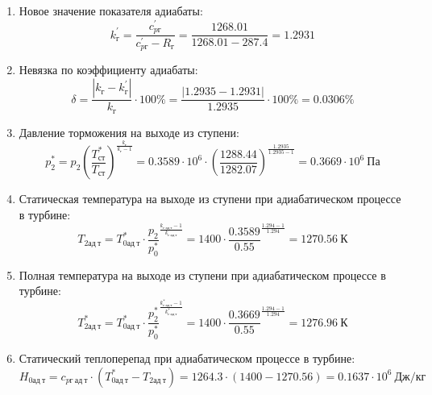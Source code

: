 \documentclass[a4paper,10pt]{article}
\begin{document}
\begin{enumerate}
        \item Новое значение показателя адиабаты:
        \[
            k_г^\prime = \frac{c_{pг}^\prime}{c_{pг}^\prime - R_г} =
                \frac{
                    1268.01
                }{
                    1268.01 - 287.4
                }
            = 1.2931
        \]

        \item Невязка по коэффициенту адиабаты:
        \[
            \delta = \frac{ \left| k_г - k_г^\prime \right| }{ k_г } \cdot 100 \%=
                \frac{
                    \left| 1.2935 - 1.2931 \right|
                }{
                    1.2935
                } \cdot 100 \% =
            0.0306 \%
        \]

        \item Давление торможения на выходе из ступени:
        \[
            p_2^* = p_2 \left(
                            \frac{ T_{ст}^* }{ T_{ст} }
                    \right) ^ \frac{ k_г }{ k_г - 1 } =
                 0.3589 \cdot 10^6 \cdot \left(
                            \frac{ 1288.44 }{ 1282.07 }
                    \right) ^
                \frac{ 1.2935 }{ 1.2935 - 1 } =
            0.3669 \cdot 10^6 \ Па
        \]

        \item Статическая температура на выходе из ступени при адиабатическом процессе в турбине:
        \[
            T_{2ад\ т} = T_{0ад\ т}^* \cdot \frac{p_2}{p_0^*} ^ {
                    \frac{k_{г\ ад\ т} - 1}{k_{г\ ад\ т} }
            } = 1400 \cdot
            \frac{ 0.3589
            }{
            0.55
            } ^ {
                    \frac{1.294 - 1}{1.294}
            } =
            1270.56\ К
        \]

        \item Полная температура на выходе из ступени при адиабатическом процессе в турбине:
        \[
            T_{2ад\ т}^* = T_{0ад\ т}^* \cdot \frac{p_2^*}{p_0^*} ^ {
                    \frac{k_{г\ ад\ т}^* - 1}{k_{г\ ад\ т}^*}
            } = 1400 \cdot
            \frac{ 0.3669
            }{
            0.55
            } ^ {
                    \frac{1.294 - 1}{1.294}
            } =
            1276.96\ К
        \]

        \item Статический теплоперепад при адиабатическом процессе в турбине:
        \[
            H_{0ад\ т} = c_{pг\ ад\ т} \cdot \left(
            T_{0ад\ т}^* - T_{2ад\ т}
            \right) =
            1264.3 \cdot \left(
            1400 - 1270.56
            \right) =
            0.1637 \cdot 10^6 \ Дж/кг
        \]


\end{enumerate}
\end{document}

